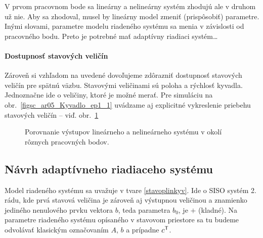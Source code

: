 \documentclass[a4paper, 10pt, ]{article}
\begin{document}
V prvom pracovnom bode sa lineárny a nelineárny systém zhodujú ale v druhom už nie. Aby sa zhodoval, musel by lineárny model zmeniť (prispôsobiť) parametre.  Inými slovami, parametre modelu riadeného systému sa menia v závislosti od pracovného bodu. Preto je potrebné mať adaptívny riadiaci systém\ldots






\paragraph{Dostupnosť stavových veličín}

Zároveň si vzhľadom na uvedené dovoľujeme zdôrazniť dostupnosť stavových veličín pre spätnú väzbu. Stavovými veličinami sú poloha a rýchlosť kyvadla. Jednoznačne ide o veličiny, ktoré je možné merať. Pre simuláciu na obr.~\ref{figsc_ar05_Kyvadlo_ep1_1} uvádzame aj explicitné vykreslenie priebehu stavových veličín -- viď. obr.~\ref{figsc_ar05_Kyvadlo_ep1_ss_1}






\begin{figure}[!b]
	\centering

    \vspace{-3mm}


    \vspace{-2mm}

	\caption{Porovnanie výstupov lineárneho a nelineárneho systému v okolí rôznych pracovných bodov.}
	\label{figsc_ar05_Kyvadlo_ep1_ss_1}

    \vspace{-2mm}

\end{figure}






\subsection{Návrh adaptívneho riadiaceho systému}

Model riadeného systému sa uvažuje v tvare \eqref{stavoplinkyv}. Ide o SISO systém 2. rádu, kde prvá stavová veličina je zároveň aj výstupnou veličinou a znamienko jediného nenulového prvku vektora $b$, teda parametra $b_0$, je $+$ (kladné). Na parametre riadeného systému opísaného v stavovom priestore sa tu budeme odvolávať klasickým označovaním $A$, $b$ a prípadne $c^{\mathsf{T}}$.
\end{document}
